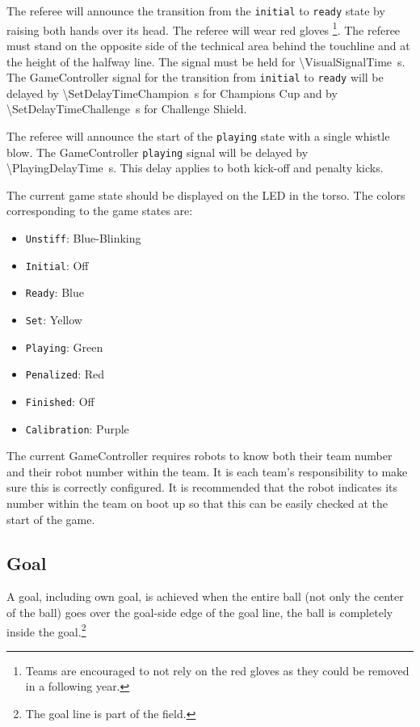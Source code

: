 The referee will announce the transition from the \texttt{initial} to \texttt{ready} state by raising both hands over its head. The referee will wear red gloves \footnote{Teams are encouraged to not rely on the red gloves as they could be removed in a following year.}.
The referee must stand on the opposite side of the technical area behind the touchline and at the height of the halfway line. 
The signal must be held for \qty{\VisualSignalTime}{\second}. 
The GameController signal for the transition from \texttt{initial} to \texttt{ready} will be delayed by \qty{\SetDelayTimeChampion}{\second} for Champions Cup and by \qty{\SetDelayTimeChallenge}{\second} for Challenge Shield. 


The referee will announce the start of the \texttt{playing} state with a single whistle blow.
The GameController \texttt{playing} signal will be delayed by \qty{\PlayingDelayTime}{\second}.
This delay applies to both kick-off and penalty kicks.

The current game state should be displayed on the LED in the torso.
The colors corresponding to the game states are:
\begin{itemize}
  \item \texttt{Unstiff}: Blue-Blinking
  \item \texttt{Initial}: Off
  \item \texttt{Ready}: Blue
  \item \texttt{Set}: Yellow
  \item \texttt{Playing}: Green
  \item \texttt{Penalized}: Red
  \item \texttt{Finished}: Off
  \item \texttt{Calibration}: Purple
\end{itemize}

The current GameController requires robots to know both their team number and their robot number within the team.
It is each team's responsibility to make sure this is correctly configured.
It is recommended that the robot indicates its number within the team on boot up so that this can be easily checked at the start of the game.

\subsection{Goal}
\label{sec:goal}

A goal, including own goal, is achieved when the entire ball (not only the center of the ball) goes over the goal-side edge of the goal line, \ie the ball is completely inside the goal.\footnote{
  The goal line is part of the field.
}


